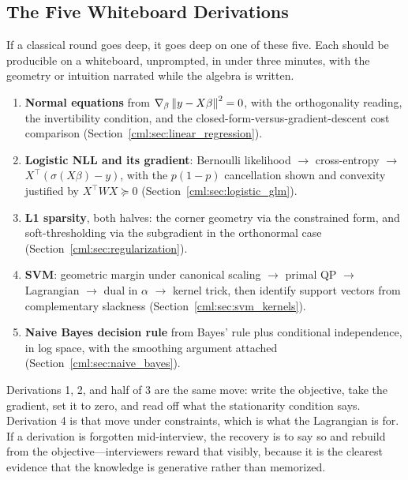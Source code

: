 \subsection{The Five Whiteboard Derivations}

If a classical round goes deep, it goes deep on one of these five. Each should be producible on a whiteboard, unprompted, in under three minutes, with the geometry or intuition narrated while the algebra is written.

\begin{enumerate}
    \item \textbf{Normal equations} from $\nabla_\beta\left\lVert y-X\beta\right\rVert^2 = 0$, with the orthogonality reading, the invertibility condition, and the closed-form-versus-gradient-descent cost comparison (Section~\ref{cml:sec:linear_regression}).
    \item \textbf{Logistic NLL and its gradient}: Bernoulli likelihood $\to$ cross-entropy $\to$ $X^{\top}(\sigma(X\beta)-y)$, with the $p(1-p)$ cancellation shown and convexity justified by $X^{\top}WX \succeq 0$ (Section~\ref{cml:sec:logistic_glm}).
    \item \textbf{L1 sparsity}, both halves: the corner geometry via the constrained form, and soft-thresholding via the subgradient in the orthonormal case (Section~\ref{cml:sec:regularization}).
    \item \textbf{SVM}: geometric margin under canonical scaling $\to$ primal QP $\to$ Lagrangian $\to$ dual in $\alpha$ $\to$ kernel trick, then identify support vectors from complementary slackness (Section~\ref{cml:sec:svm_kernels}).
    \item \textbf{Naive Bayes decision rule} from Bayes' rule plus conditional independence, in log space, with the smoothing argument attached (Section~\ref{cml:sec:naive_bayes}).
\end{enumerate}

\begin{keyinsight}
Derivations 1, 2, and half of 3 are the same move: write the objective, take the gradient, set it to zero, and read off what the stationarity condition says. Derivation 4 is that move under constraints, which is what the Lagrangian is for. If a derivation is forgotten mid-interview, the recovery is to say so and rebuild from the objective---interviewers reward that visibly, because it is the clearest evidence that the knowledge is generative rather than memorized.
\end{keyinsight}

